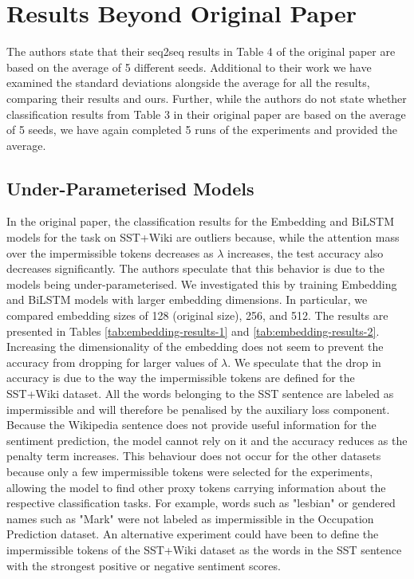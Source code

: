 \newpage

\section{Results Beyond Original Paper}

The authors state that their seq2seq results in Table 4 of the original paper are based on the average of 5 different seeds. Additional to their work we have examined the standard deviations alongside the average for all the results, comparing their results and ours. Further, while the authors do not state whether classification results from Table 3 in their original paper are based on the average of 5 seeds, we have again completed 5 runs of the experiments and provided the average.

\subsection{Under-Parameterised Models}
In the original paper, the classification results for the Embedding and BiLSTM models for the task on SST+Wiki are outliers because, while the attention mass over the impermissible tokens decreases as $\lambda$ increases, the test accuracy also decreases significantly. The authors speculate that this behavior is due to the models being under-parameterised. We investigated this by training Embedding and BiLSTM models with larger embedding dimensions. In particular, we compared embedding sizes of 128 (original size), 256, and 512. The results are presented in Tables \ref{tab:embedding-results-1} and \ref{tab:embedding-results-2}. Increasing the dimensionality of the embedding does not seem to prevent the accuracy from dropping for larger values of $\lambda$. We speculate that the drop in accuracy is due to the way the impermissible tokens are defined for the SST+Wiki dataset. All the words belonging to the SST sentence are labeled as impermissible and will therefore be penalised by the auxiliary loss component. Because the Wikipedia sentence does not provide useful information for the sentiment prediction, the model cannot rely on it and the accuracy reduces as the penalty term increases. This behaviour does not occur for the other datasets because only a few impermissible tokens were selected for the experiments, allowing the model to find other proxy tokens carrying information about the respective classification tasks. For example, words such as "lesbian" or gendered names such as "Mark" were not labeled as impermissible in the Occupation Prediction dataset. An alternative experiment could have been to define the impermissible tokens of the SST+Wiki dataset as the words in the SST sentence with the strongest positive or negative sentiment scores.

